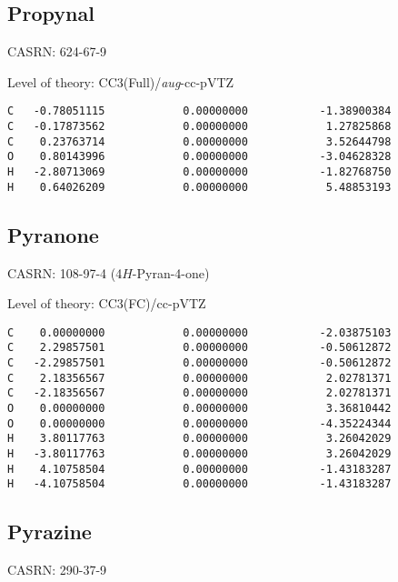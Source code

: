 \documentclass[journal=jctcce,manuscript=article,layout=traditional]{achemso}
\newcommand{\TZ}{cc-pVTZ}
\newcommand{\AVTZ}{\emph{aug}-cc-pVTZ}
\begin{document}
\subsection{Propynal}

CASRN:  624-67-9

\begin{singlespace}
\noindent  Level of theory: CC3(Full)/{\AVTZ}
\begin{verbatim}
C   -0.78051115            0.00000000           -1.38900384
C   -0.17873562            0.00000000            1.27825868
C    0.23763714            0.00000000            3.52644798
O    0.80143996            0.00000000           -3.04628328
H   -2.80713069            0.00000000           -1.82768750
H    0.64026209            0.00000000            5.48853193
\end{verbatim}
\end{singlespace}

\subsection{Pyranone}

CASRN: 108-97-4 (4$H$-Pyran-4-one)

\begin{singlespace}
\noindent Level of theory: CC3(FC)/{\TZ}
\begin{verbatim}
C    0.00000000            0.00000000           -2.03875103 
C    2.29857501            0.00000000           -0.50612872 
C   -2.29857501            0.00000000           -0.50612872 
C    2.18356567            0.00000000            2.02781371 
C   -2.18356567            0.00000000            2.02781371 
O    0.00000000            0.00000000            3.36810442 
O    0.00000000            0.00000000           -4.35224344 
H    3.80117763            0.00000000            3.26042029 
H   -3.80117763            0.00000000            3.26042029 
H    4.10758504            0.00000000           -1.43183287 
H   -4.10758504            0.00000000           -1.43183287 
\end{verbatim}
\end{singlespace}

\subsection{Pyrazine}

CASRN: 290-37-9
\end{document}
